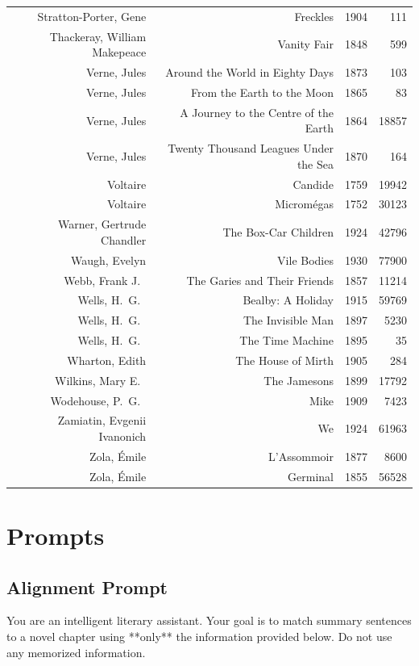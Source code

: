 \documentclass{article} %
\begin{document}
\begin{center}
\begin{tabularx}{\linewidth}{RRrr}
    Stratton-Porter, Gene & Freckles & 1904 & 111 \\
    Thackeray, William Makepeace & Vanity Fair & 1848 & 599 \\
    Verne, Jules & Around the World in Eighty Days & 1873 & 103 \\
    Verne, Jules & From the Earth to the Moon & 1865 & 83 \\
    Verne, Jules & A Journey to the Centre of the Earth & 1864 & 18857 \\
    Verne, Jules & Twenty Thousand Leagues Under the Sea & 1870 & 164 \\
    Voltaire & Candide & 1759 & 19942 \\
    Voltaire & Microm\'{e}gas & 1752 & 30123 \\
    Warner, Gertrude Chandler & The Box-Car Children & 1924 & 42796 \\
    Waugh, Evelyn & Vile Bodies & 1930 & 77900 \\
    Webb, Frank J.\ & The Garies and Their Friends & 1857 & 11214 \\
    Wells, H.\ G.\ & Bealby: A Holiday & 1915 & 59769 \\
    Wells, H.\ G.\ & The Invisible Man & 1897 & 5230 \\
    Wells, H.\ G.\ & The Time Machine & 1895 & 35 \\
    Wharton, Edith & The House of Mirth & 1905 & 284 \\
    Wilkins, Mary E.\ & The Jamesons & 1899 & 17792 \\
    Wodehouse, P.\ G.\ & Mike & 1909 & 7423 \\
    Zamiatin, Evgenii Ivanonich & We & 1924 & 61963 \\
    Zola, \'{E}mile & L'Assommoir & 1877 & 8600 \\
    Zola, \'{E}mile & Germinal & 1855 & 56528 \\
\end{tabularx}
\end{center}

\section{Prompts}
\label{sec:prompts}


\subsection{Alignment Prompt}
\label{sec:alignPrompts}

You are an intelligent literary assistant. Your goal is to match summary sentences to a novel chapter using **only** the information provided below. Do not use any memorized information.
\end{document}
